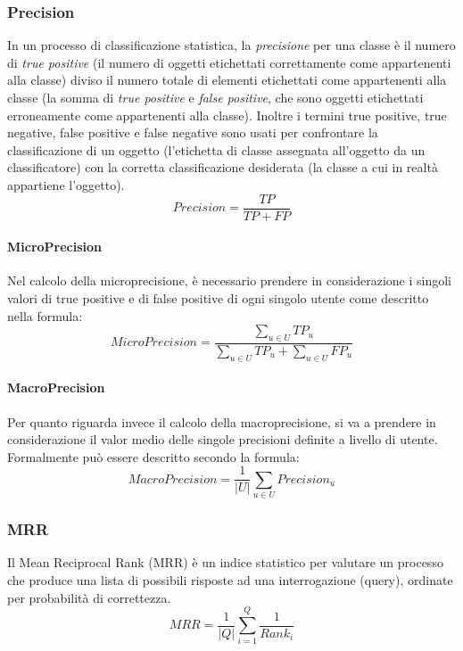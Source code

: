 \subsubsection{Precision}
In un processo di classificazione statistica, la \emph{precisione} per una classe è il numero di \emph{true positive} (il numero di oggetti etichettati correttamente come appartenenti alla classe) diviso il numero totale di elementi etichettati come appartenenti alla classe (la somma di \emph{true positive} e \emph{false positive}, che sono oggetti etichettati erroneamente come appartenenti alla classe).
Inoltre i termini true positive, true negative, false positive e false negative sono usati per confrontare la classificazione di un oggetto (l’etichetta di classe assegnata all’oggetto da un classificatore) con la corretta classificazione desiderata (la classe a cui in realtà appartiene l’oggetto).
\begin{equation*}
Precision =\frac{TP}{TP+FP}
\end{equation*}

\paragraph{MicroPrecision}
Nel calcolo della microprecisione, è necessario prendere in considerazione i singoli valori di true positive e di false positive di ogni singolo utente come descritto nella formula:
\begin{equation*}
MicroPrecision =\frac{\sum\limits_{u\in U}^{}TP_u}{\sum\limits_{u\in U}^{}TP_u+\sum\limits_{u\in U}^{}FP_u}
\end{equation*}

\paragraph{MacroPrecision}
Per quanto riguarda invece il calcolo della macroprecisione, si va a prendere in considerazione il valor medio delle singole precisioni definite a livello di utente. Formalmente può essere descritto secondo la formula:
\begin{equation*}
MacroPrecision =\frac{1}{|U|}\sum\limits_{u\in U}{Precision_u}
\end{equation*}

\subsubsection{MRR}
Il Mean Reciprocal Rank (MRR) è un indice statistico per valutare un processo che produce una lista di possibili risposte ad una interrogazione (query), ordinate per probabilità di correttezza.
\begin{equation*}
MRR = \frac{1}{|Q|}\sum_{i=1}^{Q}{\frac{1}{Rank_i}}
\end{equation*}

